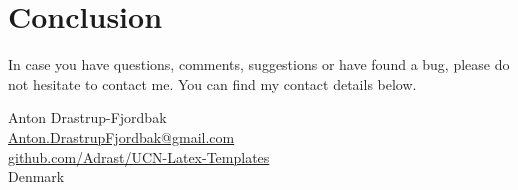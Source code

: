 \chapter{Conclusion}\label{ch:conclusion}
In case you have questions, comments, suggestions or have found a bug, please do not hesitate to contact me. You can find my contact details below.
  \begin{center}
    Anton Drastrup-Fjordbak\\
    \href{mailto: Anton.DrastrupFjordbak@gmail.com}{Anton.DrastrupFjordbak@gmail.com}\\
    \href{https://github.com/Adrast/UCN-Latex-Templates}{github.com/Adrast/UCN-Latex-Templates}\\
    Denmark
  \end{center}
